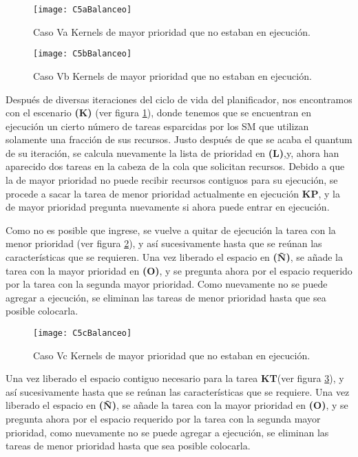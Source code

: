     \begin{figure}[!]
      \raggedleft
        \texttt{[image: C5aBalanceo]}
        \caption{Caso Va Kernels de mayor prioridad que no estaban en ejecución.}
        \label{fig:C5aBalanceo}
    \end{figure}
    
    \begin{figure}[!]
      \centering
        \texttt{[image: C5bBalanceo]}
        \caption{Caso Vb Kernels de mayor prioridad que no estaban en ejecución.}
        \label{fig:C5bBalanceo}
    \end{figure}
    
    Después de diversas iteraciones del ciclo de vida del planificador, nos encontramos con el escenario \textbf{(K)} (ver figura \ref{fig:C5aBalanceo}), donde tenemos que se encuentran en ejecución un cierto número de tareas esparcidas por los SM que utilizan solamente una fracción de sus recursos. Justo después de que se acaba el quantum de su iteración, se calcula nuevamente la lista de prioridad en \textbf{(L)},y, ahora han aparecido dos tareas en la cabeza de la cola que solicitan recursos.
    Debido a que la de mayor prioridad no puede recibir recursos contiguos para su ejecución, se procede a sacar la tarea de menor prioridad actualmente en ejecución \textbf{KP}, y la de mayor prioridad pregunta nuevamente si ahora puede entrar en ejecución.
\newline

    Como no es posible que ingrese, se vuelve a quitar de ejecución la tarea con la menor prioridad (ver figura  \ref{fig:C5bBalanceo}), y así sucesivamente hasta que se reúnan las características que se requieren. Una vez liberado el espacio en \textbf{(Ñ)}, se añade la tarea con la mayor prioridad en \textbf{(O)}, y se pregunta ahora por el espacio requerido por la tarea con la segunda mayor prioridad. Como nuevamente no se puede agregar a ejecución, se eliminan las tareas de menor prioridad hasta que sea posible colocarla.
\newline

    \begin{figure}[!]
      \centering
        \texttt{[image: C5cBalanceo]}
        \caption{Caso Vc Kernels de mayor prioridad que no estaban en ejecución.}
        \label{fig:C5cBalanceo}
    \end{figure}

    Una vez liberado el espacio contiguo necesario para la tarea \textbf{KT}(ver figura  \ref{fig:C5cBalanceo}), y así sucesivamente hasta que se reúnan las características que se requiere. Una vez liberado el espacio en \textbf{(Ñ)}, se añade la tarea con la mayor prioridad en \textbf{(O)}, y se pregunta ahora por el espacio requerido por la tarea con la segunda mayor prioridad, como nuevamente no se puede agregar a ejecución, se eliminan las tareas de menor prioridad hasta que sea posible colocarla.
    
